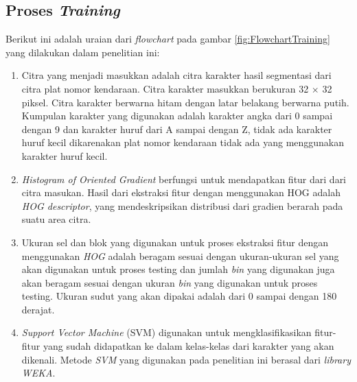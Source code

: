 \subsection{Proses \textit{Training}}

\begin{adjustbox}{width=1\textwidth}
	\noindent\begin{minipage}{\linewidth}
		\label{fig:FlowchartTraining}
	\end{minipage}
\end{adjustbox}

Berikut ini adalah uraian dari \textit{flowchart} pada gambar \ref{fig:FlowchartTraining} yang dilakukan dalam penelitian ini:
\begin{enumerate}
\item Citra yang menjadi masukkan adalah citra karakter hasil segmentasi dari citra plat nomor kendaraan. Citra karakter masukkan berukuran 32 $\times$ 32 piksel. Citra karakter berwarna hitam dengan latar belakang berwarna putih. Kumpulan karakter yang digunakan adalah karakter angka dari 0 sampai dengan 9 dan karakter huruf dari A sampai dengan Z, tidak ada karakter huruf kecil dikarenakan plat nomor kendaraan tidak ada yang menggunakan karakter huruf kecil.
\item \textit{Histogram of Oriented Gradient} berfungsi untuk mendapatkan fitur dari dari citra masukan. Hasil dari ekstraksi fitur dengan menggunakan HOG adalah \textit{HOG descriptor}, yang mendeskripsikan distribusi dari gradien berarah pada suatu area citra.
\item Ukuran sel dan blok yang digunakan untuk proses ekstraksi fitur dengan menggunakan \textit{HOG} adalah beragam sesuai dengan ukuran-ukuran sel yang akan digunakan untuk proses testing dan jumlah \textit{bin} yang digunakan juga akan beragam sesuai dengan ukuran \textit{bin} yang digunakan untuk proses testing. Ukuran sudut yang akan dipakai adalah dari 0 sampai dengan 180 derajat.
\item \textit{Support Vector Machine} (SVM) digunakan untuk mengklasifikasikan fitur-fitur yang sudah didapatkan ke dalam kelas-kelas dari karakter yang akan dikenali. Metode \textit{SVM} yang digunakan pada penelitian ini berasal dari \textit{library WEKA}.\\
\end{enumerate}

